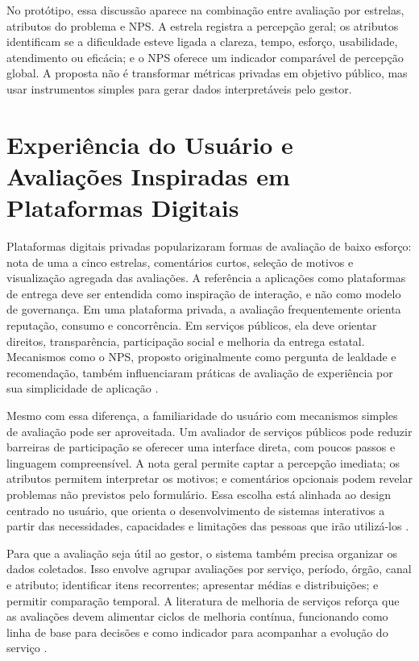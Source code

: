 No protótipo, essa discussão aparece na combinação entre avaliação por estrelas,
atributos do problema e NPS. A estrela registra a percepção geral; os atributos
identificam se a dificuldade esteve ligada a clareza, tempo, esforço,
usabilidade, atendimento ou eficácia; e o NPS oferece um indicador comparável de
percepção global. A proposta não é transformar métricas privadas em objetivo
público, mas usar instrumentos simples para gerar dados interpretáveis pelo
gestor.

\section{Experiência do Usuário e Avaliações Inspiradas em Plataformas Digitais}

Plataformas digitais privadas popularizaram formas de avaliação de baixo esforço:
nota de uma a cinco estrelas, comentários curtos, seleção de motivos e
visualização agregada das avaliações. A referência a aplicações como plataformas
de entrega deve ser entendida como inspiração de interação, e não como modelo de
governança. Em uma plataforma privada, a avaliação frequentemente orienta
reputação, consumo e concorrência. Em serviços públicos, ela deve orientar
direitos, transparência, participação social e melhoria da entrega estatal.
Mecanismos como o NPS, proposto originalmente como pergunta de lealdade e
recomendação, também influenciaram práticas de avaliação de experiência por sua
simplicidade de aplicação \cite{reichheld2003nps}.

Mesmo com essa diferença, a familiaridade do usuário com mecanismos simples de
avaliação pode ser aproveitada. Um avaliador de serviços públicos pode reduzir
barreiras de participação se oferecer uma interface direta, com poucos passos e
linguagem compreensível. A nota geral permite captar a percepção imediata; os
atributos permitem interpretar os motivos; e comentários opcionais podem revelar
problemas não previstos pelo formulário. Essa escolha está alinhada ao design
centrado no usuário, que orienta o desenvolvimento de sistemas interativos a
partir das necessidades, capacidades e limitações das pessoas que irão utilizá-los
\cite{iso92412102019}.

Para que a avaliação seja útil ao gestor, o sistema também precisa organizar os
dados coletados. Isso envolve agrupar avaliações por serviço, período, órgão,
canal e atributo; identificar itens recorrentes; apresentar médias e distribuições;
e permitir comparação temporal. A literatura de melhoria de serviços reforça que
as avaliações devem alimentar ciclos de melhoria contínua, funcionando como linha
de base para decisões e como indicador para acompanhar a evolução do serviço
\cite{limaPereira2020modulo4,govuk2021usingData,govbrFerramentaAvaliacao}.

